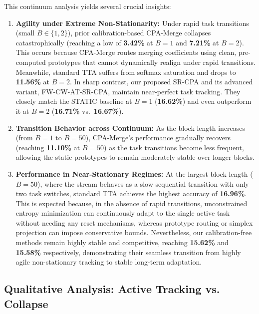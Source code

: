 \documentclass{article}
\theoremstyle{plain}
\theoremstyle{definition}
\theoremstyle{remark}
\begin{document}
This continuum analysis yields several crucial insights:
\begin{enumerate}
    \item \textbf{Agility under Extreme Non-Stationarity:} Under rapid task transitions (small $B \in \{1, 2\}$), prior calibration-based CPA-Merge collapses catastrophically (reaching a low of \textbf{3.42\%} at $B=1$ and \textbf{7.21\%} at $B=2$). This occurs because CPA-Merge routes merging coefficients using clean, pre-computed prototypes that cannot dynamically realign under rapid transitions. Meanwhile, standard TTA suffers from softmax saturation and drops to \textbf{11.56\%} at $B=2$. In sharp contrast, our proposed SR-CPA and its advanced variant, FW-CW-AT-SR-CPA, maintain near-perfect task tracking. They closely match the STATIC baseline at $B=1$ (\textbf{16.62\%}) and even outperform it at $B=2$ (\textbf{16.71\%} vs.\ \textbf{16.67\%}).
    \item \textbf{Transition Behavior across Continuum:} As the block length increases (from $B=1$ to $B=50$), CPA-Merge's performance gradually recovers (reaching \textbf{11.10\%} at $B=50$) as the task transitions become less frequent, allowing the static prototypes to remain moderately stable over longer blocks. 
    \item \textbf{Performance in Near-Stationary Regimes:} At the largest block length ($B=50$), where the stream behaves as a slow sequential transition with only two task switches, standard TTA achieves the highest accuracy of \textbf{16.96\%}. This is expected because, in the absence of rapid transitions, unconstrained entropy minimization can continuously adapt to the single active task without needing any reset mechanisms, whereas prototype routing or simplex projection can impose conservative bounds. Nevertheless, our calibration-free methods remain highly stable and competitive, reaching \textbf{15.62\%} and \textbf{15.58\%} respectively, demonstrating their seamless transition from highly agile non-stationary tracking to stable long-term adaptation.
\end{enumerate}

\subsection{Qualitative Analysis: Active Tracking vs. Collapse}
\label{subsec:qualitative}
\end{document}

